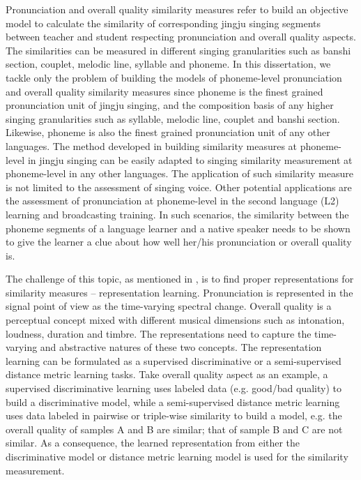 Pronunciation and overall quality similarity measures refer to build an objective model to calculate the similarity of corresponding jingju singing segments between teacher and student respecting pronunciation and overall quality aspects. The similarities can be measured in different singing granularities such as \gls{banshi} section, couplet, melodic line, syllable and phoneme. In this dissertation, we tackle only the problem of building the models of phoneme-level pronunciation and overall quality similarity measures since phoneme is the finest grained pronunciation unit of jingju singing, and the composition basis of any higher singing granularities such as syllable, melodic line, couplet and \gls{banshi} section. Likewise, phoneme is also the finest grained pronunciation unit of any other languages. The method developed in building similarity measures at phoneme-level in jingju singing can be easily adapted to singing similarity measurement at phoneme-level in any other languages. The application of such similarity measure is not limited to the assessment of singing voice. Other potential applications are the assessment of pronunciation at phoneme-level in the second language (L2) learning and broadcasting training. In such scenarios, the similarity between the phoneme segments of a language learner and a native speaker needs to be shown to give the learner a clue about how well her/his pronunciation or overall quality is. 

The challenge of this topic, as mentioned in , is to find proper representations for similarity measures -- representation learning. Pronunciation is represented in the signal point of view as the time-varying spectral change. Overall quality is a perceptual concept mixed with different musical dimensions such as intonation, loudness, duration and timbre. The representations need to capture the time-varying and abstractive natures of these two concepts. The representation learning can be formulated as a supervised discriminative or a semi-supervised distance metric learning tasks. Take overall quality aspect as an example, a supervised discriminative learning uses labeled data (e.g. good/bad quality) to build a discriminative model, while a semi-supervised distance metric learning uses data labeled in pairwise or triple-wise similarity to build a model, e.g. the overall quality of samples A and B are similar; that of sample B and C are not similar. As a consequence, the learned representation from either the discriminative model or distance metric learning model is used for the similarity measurement.

